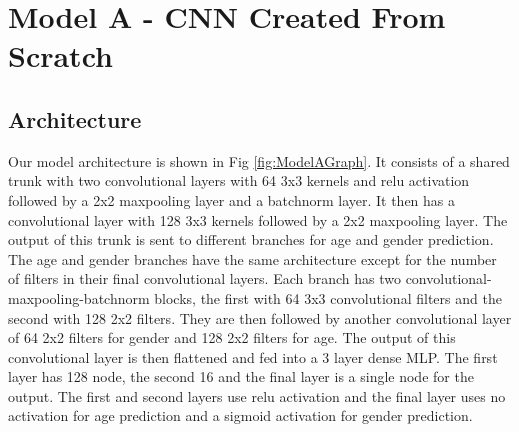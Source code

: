 





\section{Model A - CNN Created From Scratch}
\subsection{Architecture}
Our model architecture is shown in Fig \ref{fig:ModelAGraph}. It consists of a shared trunk with two convolutional 
layers with 64 3x3 kernels and relu activation followed by a 2x2 maxpooling layer and a batchnorm layer. It then 
has a convolutional layer with 128 3x3 kernels followed by a 2x2 maxpooling layer. The output of this trunk is 
sent to different branches for age and gender prediction. The age and gender branches have the same architecture
except for the number of filters in their final convolutional layers. Each branch has two 
convolutional-maxpooling-batchnorm blocks, the first with 64 3x3 convolutional filters and the second with 
128 2x2 filters. They are then followed by another convolutional layer of 64 2x2 filters for gender and 128 2x2 
filters for age. The output of this convolutional layer is then flattened and fed into a 3 layer dense MLP. The first
layer has 128 node, the second 16 and the final layer is a single node for the output. The first and second layers 
use relu activation and the final layer uses no activation for age prediction and a sigmoid activation for gender 
prediction.

